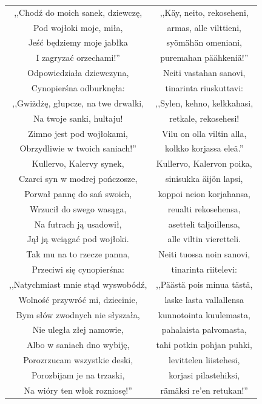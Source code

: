 \documentclass[11pt,a4paper,twoside]{report}
\begin{document}
{\centering
\small
\begin{longtable}{c c}
,,Chodź do moich sanek, dziewczę, & ,,Käy, neito, rekoseheni, \\
Pod wojłoki moje, miła, & armas, alle vilttieni, \\
Jeść będziemy moje jabłka & syömähän omeniani, \\
I zagryzać orzechami!'' & puremahan päähkeniä!'' \\
Odpowiedziała dziewczyna, & Neiti vastahan sanovi, \\
Cynopierśna odburknęła: & tinarinta riuskuttavi: \\
,,Gwiżdżę, głupcze, na twe drwalki, & ,,Sylen, kehno, kelkkahasi, \\ \newpage
Na twoje sanki, hultaju! & retkale, rekosehesi! \\
Zimno jest pod wojłokami, & Vilu on olla viltin alla, \\
Obrzydliwie w twoich saniach!'' & kolkko korjassa eleä.'' \\
Kullervo, Kalervy synek, & Kullervo, Kalervon poika, \\
Czarci syn w modrej pończosze, & sinisukka äijön lapsi, \\
Porwał pannę do sań swoich, & koppoi neion korjahansa, \\
Wrzucił do swego wasąga, & reualti rekosehensa, \\
Na futrach ją usadowił, & asetteli taljoillensa, \\
Jął ją wciągać pod wojłoki. & alle viltin vieretteli. \\
Tak mu na to rzecze panna, & Neiti tuossa noin sanovi, \\
Przeciwi się cynopierśna: & tinarinta riitelevi: \\
,,Natychmiast mnie stąd wyswobódź, & ,,Päästä pois minua tästä, \\
Wolność przywróć mi, dziecinie, & laske lasta vallallensa \\
Bym słów zwodnych nie słyszała, & kunnotointa kuulemasta, \\
Nie uległa złej namowie, & pahalaista palvomasta, \\
Albo w saniach dno wybiję, & tahi potkin pohjan puhki, \\
Porozrzucam wszystkie deski, & levittelen liistehesi, \\
Porozbijam je na trzaski, & korjasi pilastehiksi, \\
Na wióry ten włok rozniosę!'' & rämäksi re'en retukan!'' \\
\end{longtable}
}
\end{document}
